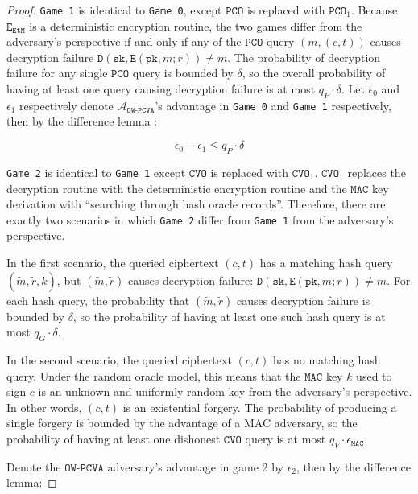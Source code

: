 \documentclass[floatrow,journal=tches,submission]{iacrtrans}
\newcommand{\monospace}{\texttt}
\newcommand{\encrypt}{\monospace{E}}
\newcommand{\decrypt}{\monospace{D}}
\newcommand{\etm}{\monospace{EtM}}  %
\newcommand{\mac}{\monospace{MAC}}
\newcommand{\pk}{\monospace{pk}}
\newcommand{\sk}{\monospace{sk}}
\newcommand{\pco}{\monospace{PCO}}
\newcommand{\cvo}{\monospace{CVO}}
\begin{document}
\begin{proof}
    \monospace{Game 1} is identical to \monospace{Game 0}, except $\pco$ is replaced with $\pco_1$. Because $\encrypt_\etm$ is a deterministic encryption routine, the two games differ from the adversary's perspective if and only if any of the $\pco$ query $(m, (c, t))$ causes decryption failure $\decrypt(\sk, \encrypt(\pk, m; r)) \neq m$. The probability of decryption failure for any single $\pco$ query is bounded by $\delta$, so the overall probability of having at least one query causing decryption failure is at most $q_P \cdot \delta$. Let $\epsilon_0$ and $\epsilon_1$ respectively denote $\mathcal{A}_\monospace{OW-PCVA}$'s advantage in \monospace{Game 0} and \monospace{Game 1} respectively, then by the difference lemma \cite{shoup2004sequences}:

    \begin{equation}\label{eq:ep0-ep1}
        \epsilon_0 - \epsilon_1 \leq q_P \cdot \delta
    \end{equation}

    \monospace{Game 2} is identical to \monospace{Game 1} except $\cvo$ is replaced with $\cvo_1$. $\cvo_1$ replaces the decryption routine with the deterministic encryption routine and the $\mac$ key derivation with ``searching through hash oracle records''. Therefore, there are exactly two scenarios in which \monospace{Game 2} differ from \monospace{Game 1} from the adversary's perspective.

    In the first scenario, the queried ciphertext $(c, t)$ has a matching hash query $(\tilde{m}, \tilde{r}, \tilde{k})$, but $(\tilde{m}, \tilde{r})$ causes decryption failure: $\decrypt(\sk, \encrypt(\pk, m; r)) \neq m$. For each hash query, the probability that $(\tilde{m}, \tilde{r})$ causes decryption failure is bounded by $\delta$, so the probability of having at least one such hash query is at most $q_G \cdot \delta$.

    In the second scenario, the queried ciphertext $(c, t)$ has no matching hash query. Under the random oracle model, this means that the $\mac$ key $k$ used to sign $c$ is an unknown and uniformly random key from the adversary's perspective. In other words, $(c, t)$ is an existential forgery. The probability of producing a single forgery is bounded by the advantage of a MAC adversary, so the probability of having at least one dishonest $\cvo$ query is at most $q_V \cdot \epsilon_\mac$.

    Denote the $\monospace{OW-PCVA}$ adversary's advantage in game 2 by $\epsilon_2$, then by the difference lemma:


\end{proof}
\end{document}
